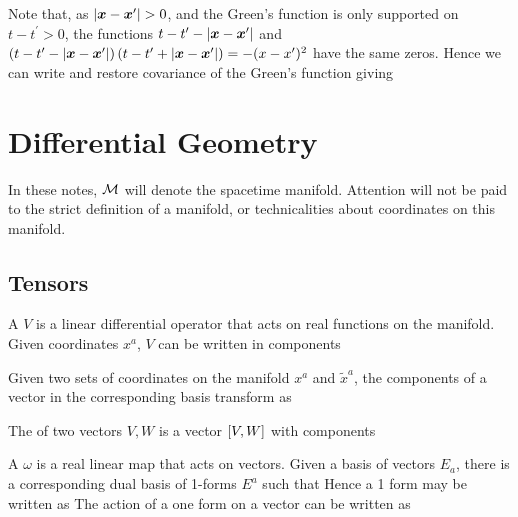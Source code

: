 \documentclass{article}
\begin{document}
Note that, as $\abs{\bm{x} - \bm{x}^\prime} > 0$, and the Green's function is only supported on $t-t^\prime > 0$, the functions $t-t^\prime - \abs{\bm{x}-\bm{x}^\prime}$ and $\pround{t-t^\prime - \abs{\bm{x}-\bm{x}^\prime}}\pround{t-t^\prime + \abs{\bm{x}-\bm{x}^\prime}} = -(x-x^\prime)^2 $ have the same zeros. Hence we can write 
and restore covariance of the Green's function giving 
\section{Differential Geometry}
In these notes, $\mc{M}$ will denote the spacetime manifold. Attention will not be paid to the strict definition of a manifold, or technicalities about coordinates on this manifold. 
\subsection{Tensors}
\begin{definition}[Vectors]
A  $V$ is a linear differential operator that acts on real functions on the manifold. Given coordinates $x^a$, $V$ can be written in components
\end{definition}

\begin{lemma}
Given two sets of coordinates on the manifold $x^a$ and $\tilde{x}^a$, the components of a vector in the corresponding basis transform as 
\end{lemma}

\begin{definition}[Commutator]
The  of two vectors $V,W$ is a vector $\comm[V]{W}$ with components 
\end{definition}

\begin{definition}
A  $\omega$ is a real linear map that acts on vectors. Given a basis of vectors $E_a$, there is a corresponding dual basis of 1-forms $E^a$ such that 
Hence a 1 form may be written as 
The action of a one form on a vector can be written as 
\end{definition}
\end{document}
